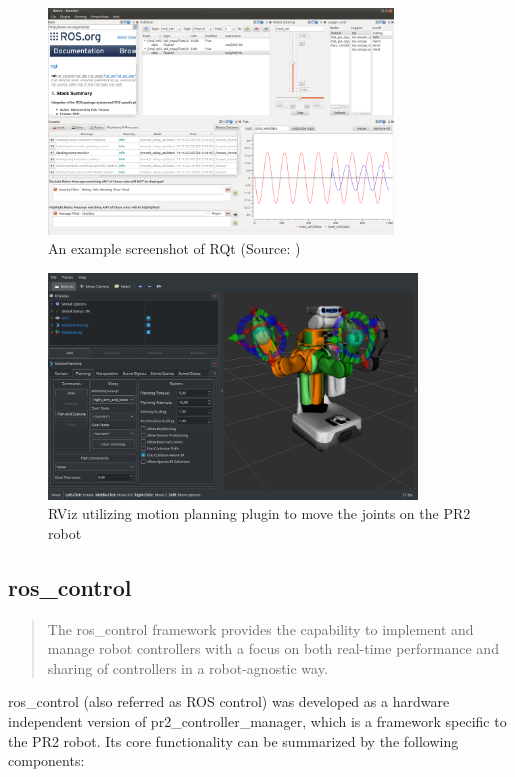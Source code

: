 \documentclass[english,inz,shortabstract]{iithesis}
\begin{document}
		\begin{figure}[ht]
			\centering
			\captionsetup{margin=2cm}
			\includegraphics[height=6cm]{img/rqt.png}
			\caption{An example screenshot of RQt (Source: \cite{ros:rqt})}
			\label{fig:rqt}
		\end{figure}

\pagebreak

		\begin{figure}[ht]
			\centering
			\captionsetup{margin=2cm}
			\includegraphics[height=6cm]{img/rviz_pr2.png}
			\caption{RViz utilizing motion planning plugin to move the joints on the PR2 robot}
			\label{fig:rviz_pr2}
		\end{figure}

	\subsection{ros\_control}
	
	\begin{quote}
		The ros\_control framework provides the capability to implement and manage robot controllers with a focus on both real-time performance and sharing of controllers in a robot-agnostic way.
		\cite{ros_control:paper}
	\end{quote}

	\textsf{ros\_control} (also referred as \textsf{ROS control}) was developed as a hardware independent version of \textsf{pr2\_controller\_manager}, which is a framework specific to the PR2 robot. Its core functionality can be summarized by the following components:
\end{document}

